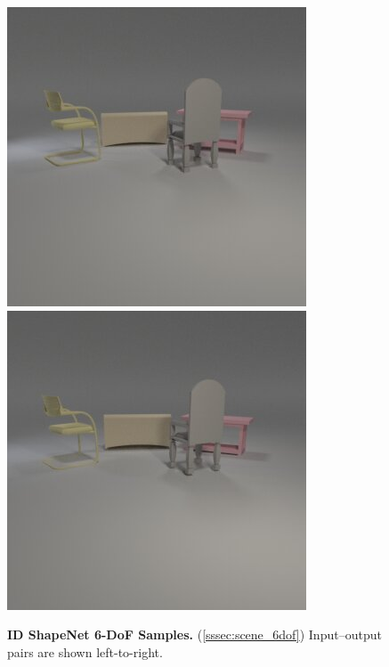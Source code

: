 \begin{figure}
\includegraphics[width=0.2475\linewidth]{figures/shapenet/ID/3_in.jpg}\hfill
\includegraphics[width=0.2475\linewidth]{figures/shapenet/ID/3_out.jpg}
\caption{\textbf{ID ShapeNet 6-DoF Samples.} (\cref{sssec:scene_6dof}) Input--output pairs are shown left-to-right.}
\label{fig:scene_6dof_id_samples_additional}
\end{figure}

